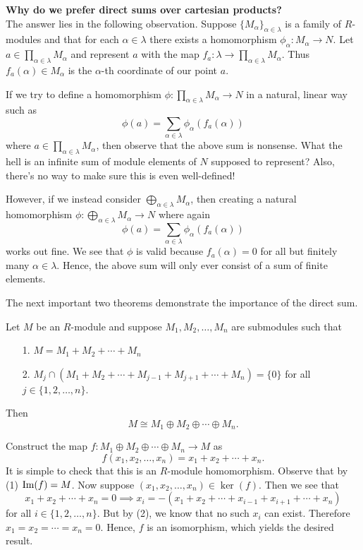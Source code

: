 \noindent\textbf{Why do we prefer direct sums over cartesian products?} 
\\

The answer lies in the following observation. Suppose
$\{M_{\alpha}\}_{\alpha \in \lambda}$ is a family of $R$-modules and
that for each $\alpha \in \lambda$ there exists a homomorphism
$\phi_\alpha : M_\alpha \to N$. Let $a \in \displaystyle
\prod_{\alpha \in \lambda}M_\alpha$ and represent $a$ with the map
$f_a:\lambda \to \displaystyle \prod_{\alpha \in
\lambda}M_{\alpha}$. Thus $f_a(\alpha) \in M_\alpha$ is the $\alpha$-th
coordinate of our point $a$.

If we try to define
a homomorphism $\displaystyle \phi : \prod_{\alpha \in
\lambda}M_\alpha \to N$ in a natural, linear way such as 
\[
    \phi(a) = \sum_{\alpha \in \lambda}\phi_\alpha(f_a(\alpha))
\]
where $\displaystyle a \in \prod_{\alpha \in \lambda}M_{\alpha}$,
then observe that the above sum is nonsense. What the hell is an
infinite sum of module elements of $N$ supposed to represent?
Also, there's no way to make sure this is even well-defined!

However, if we instead consider $\displaystyle \bigoplus_{\alpha
\in \lambda}M_{\alpha}$, then creating a natural homomorphism
$\displaystyle \phi: \bigoplus_{\alpha \in 
\lambda}M_{\alpha} \to N$ where again 
\[
    \phi(a) = \sum_{\alpha \in \lambda}\phi_\alpha(f_a(\alpha))
\]
works out fine. We see that $\phi$ is valid because $f_a(\alpha) =
0$ for all but finitely many $\alpha \in \lambda$. Hence, the
above sum will only ever consist of a sum of finite elements.

The next important two theorems demonstrate the importance of the
direct sum.

\begin{thm}\label{fin_module_sums}
    Let $M$ be an $R$-module and suppose $M_1, M_2, \dots, M_n$
    are submodules such that 
    \begin{itemize}
        \item[1.] $M = M_1 + M_2 + \cdots + M_n$
        \item[2.] $M_j \cap (M_1 + M_2 + \cdots + M_{j-1} + M_{j +
        1} + \cdots + M_n) = \{0\}$ for all $j \in \{1, 2, \dots,
        n\}$. 
    \end{itemize}
    Then 
    \[
        M \cong M_1 \oplus M_2 \oplus \cdots \oplus M_n.
    \]
    \vspace{-0.8cm}
\end{thm}

\begin{prf}
    Construct the map $f:M_1 \oplus M_2 \oplus
    \cdots \oplus M_n \to M$ as 
    \[
        f(x_1, x_2, \dots, x_n) = x_1 + x_2 + \cdots + x_n.
    \]
    It is simple to check that this is an $R$-module homomorphism.
    Observe that by (1) $\mbox{Im}(f) = M$. Now suppose $(x_1, x_2, \dots, x_n) \in \ker(f)$. Then
    we see that 
    \[
        x_1 + x_2 + \cdots + x_n = 0 \implies x_i = -(x_1 + x_2 + \cdots + x_{i-1} + x_{i+1} + \cdots + x_n)
    \]
    for all $i \in \{1, 2, \dots, n\}$. But by (2), we know that
    no such $x_i$ can exist. Therefore $x_1 = x_2 = \cdots = x_n =
    0$. Hence, $f$ is an isomorphism, which yields the desired result.
\end{prf}

